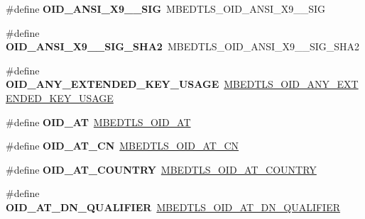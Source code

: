 \begin{DoxyCompactItemize}
\item 
\mbox{\label{compat-1_83_8h_aea8b56afb4558ec3ca16314af8defe81}} 
\#define {\bfseries O\+I\+D\+\_\+\+A\+N\+S\+I\+\_\+\+X9\+\_\+\_\+\+S\+IG}~M\+B\+E\+D\+T\+L\+S\+\_\+\+O\+I\+D\+\_\+\+A\+N\+S\+I\+\_\+\+X9\+\_\+\_\+\+S\+IG
\item 
\mbox{\label{compat-1_83_8h_a74f5704470ad0b9af6c9a4bb102cf01e}} 
\#define {\bfseries O\+I\+D\+\_\+\+A\+N\+S\+I\+\_\+\+X9\+\_\+\_\+\+S\+I\+G\+\_\+\+S\+H\+A2}~M\+B\+E\+D\+T\+L\+S\+\_\+\+O\+I\+D\+\_\+\+A\+N\+S\+I\+\_\+\+X9\+\_\+\_\+\+S\+I\+G\+\_\+\+S\+H\+A2
\item 
\mbox{\label{compat-1_83_8h_aa782cdcc5b462cfbf093f08e782fbb00}} 
\#define {\bfseries O\+I\+D\+\_\+\+A\+N\+Y\+\_\+\+E\+X\+T\+E\+N\+D\+E\+D\+\_\+\+K\+E\+Y\+\_\+\+U\+S\+A\+GE}~\mbox{\hyperlink{oid_8h_a61da0671b3897e73edf219d44e45b693}{M\+B\+E\+D\+T\+L\+S\+\_\+\+O\+I\+D\+\_\+\+A\+N\+Y\+\_\+\+E\+X\+T\+E\+N\+D\+E\+D\+\_\+\+K\+E\+Y\+\_\+\+U\+S\+A\+GE}}
\item 
\mbox{\label{compat-1_83_8h_a042dbed8c4890074dfbd9ebc353dd501}} 
\#define {\bfseries O\+I\+D\+\_\+\+AT}~\mbox{\hyperlink{oid_8h_add867a815d56c71f8728a343c57bd963}{M\+B\+E\+D\+T\+L\+S\+\_\+\+O\+I\+D\+\_\+\+AT}}
\item 
\mbox{\label{compat-1_83_8h_a5c2207a76142b3c4e5ef1986d8c39a9c}} 
\#define {\bfseries O\+I\+D\+\_\+\+A\+T\+\_\+\+CN}~\mbox{\hyperlink{oid_8h_aed77a0ed6d223075b9fb1f346368cf89}{M\+B\+E\+D\+T\+L\+S\+\_\+\+O\+I\+D\+\_\+\+A\+T\+\_\+\+CN}}
\item 
\mbox{\label{compat-1_83_8h_a4e9577d2d99a1268e9a7c3a89b4b9311}} 
\#define {\bfseries O\+I\+D\+\_\+\+A\+T\+\_\+\+C\+O\+U\+N\+T\+RY}~\mbox{\hyperlink{oid_8h_aa0a40910c92769782568fba1aa197310}{M\+B\+E\+D\+T\+L\+S\+\_\+\+O\+I\+D\+\_\+\+A\+T\+\_\+\+C\+O\+U\+N\+T\+RY}}
\item 
\mbox{\label{compat-1_83_8h_ac1fa277f1dfc9d47afa372922660ab09}} 
\#define {\bfseries O\+I\+D\+\_\+\+A\+T\+\_\+\+D\+N\+\_\+\+Q\+U\+A\+L\+I\+F\+I\+ER}~\mbox{\hyperlink{oid_8h_a2d1401e6d2a88766988d39926a3e3c5b}{M\+B\+E\+D\+T\+L\+S\+\_\+\+O\+I\+D\+\_\+\+A\+T\+\_\+\+D\+N\+\_\+\+Q\+U\+A\+L\+I\+F\+I\+ER}}

\end{DoxyCompactItemize}
